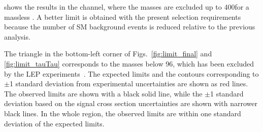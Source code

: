 shows the results in the \tauTau channel, where the \chione masses are excluded up to 400\GeV for a massless \PSGczDo. 
A better limit is obtained with the present selection requirements because the number of SM background events is reduced relative to the previous analysis.

The triangle in the bottom-left corner of Figs.~\ref{fig:limit_final} and 
\ref{fig:limit_tauTau} corresponds to the \sTau masses below 96\GeV, which has been excluded by the LEP experiments~\cite{lepsusy}.
The expected limits and the contours corresponding to $\pm$1 standard deviation from experimental uncertainties are shown as red lines. 
The observed limits are shown with a black solid line, 
while the $\pm$1 standard deviation based on the signal cross section uncertainties are shown with narrower black lines.
In the whole region, the observed limits are within one standard deviation of the expected limits.  


